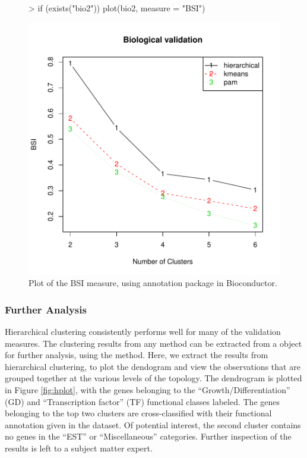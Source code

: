 \documentclass[11pt]{article}
\begin{document}
\begin{figure}
  \centering
\begin{Schunk}
\begin{Sinput}
> if (exists("bio2")) plot(bio2, measure = "BSI")
\end{Sinput}
\end{Schunk}
\includegraphics{clValid-022}
  \caption{Plot of the BSI measure, using annotation package
     in Bioconductor.}
  \label{fig:BSI2}
\end{figure}




\subsubsection*{Further Analysis}

Hierarchical clustering consistently performs well for many of the
validation measures. The clustering results from any method can be
extracted from a  object for further analysis, using the
 method.  Here, we
extract the results from hierarchical clustering, to plot the
dendogram and view the observations that are grouped together at the
various levels of the topology.  
The dendrogram is plotted in Figure
\ref{fig:hplot}, with the genes belonging to the
``Growth/Differentiation'' (GD) and ``Transcription factor'' (TF) functional
classes labeled. 
The genes belonging to the top two clusters are
cross-classified with their functional annotation given in the
dataset. Of potential interest, the second cluster contains no
genes in the ``EST'' or ``Miscellaneous'' categories.  Further
inspection of the results is left to a subject matter expert.  
\end{document}
